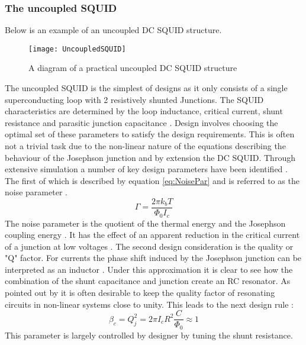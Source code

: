\subsubsection*{The uncoupled SQUID}
Below is an example of an uncoupled DC SQUID structure. 
\begin{figure}[h]
    \centering
    \texttt{[image: UncoupledSQUID]}
    \caption{A diagram of a practical uncoupled DC SQUID structure \cite{DCSQUIDdesignImage}}
    \label{fig:UncoupledSQUID}
\end{figure}
The uncoupled SQUID is the simplest of designs as it only consists of a single superconducting loop with 2 resistively shunted Junctions. The SQUID characteristics are determined by the loop inductance, critical current, shunt resistance and parasitic junction capacitance \cite{Drung2016NBSQUIDS}. Design involves choosing the optimal set of these parameters to satisfy the design requirements. This is often not a trivial task due to the non-linear nature of the equations describing the behaviour of the Josephson junction and by extension the DC SQUID. Through extensive simulation a number of key design parameters have been identified \cite{Drung2016NBSQUIDS}. The first of which is described by equation \ref{eq:NoisePar} and is referred to as the noise parameter \cite{SQUIDhandbook}. 
\begin{equation}
    \Gamma = \frac{2\pi k_bT}{\Phi_0I_c}
    \label{eq:NoisePar}
\end{equation} 
The noise parameter is the quotient of the thermal energy and the Josephson coupling energy \cite{SQUIDhandbook}. It has the effect of an apparent reduction in the critical current of a junction at low voltages \cite{Drung2016NBSQUIDS}. \newline
The second design consideration is the quality or "Q" factor. For currents the phase shift induced by the Josephson junction can be interpreted as an inductor \cite{SQUIDhandbook}. Under this approximation it is clear to see how the combination of the shunt capacitance and junction create an RC resonator. As pointed out by \cite{Drung2016NBSQUIDS} it is often desirable to keep the quality factor of resonating circuits in non-linear systems close to unity. This leads to the next design rule \cite{SQUIDhandbook}:
\begin{equation}
    \beta_c = Q_j^2 = 2\pi I_cR^2\frac{C}{\Phi_0} \approx 1
    \label{eq:QFACT}
\end{equation}
This parameter is largely controlled by designer by tuning the shunt resistance.\newline
